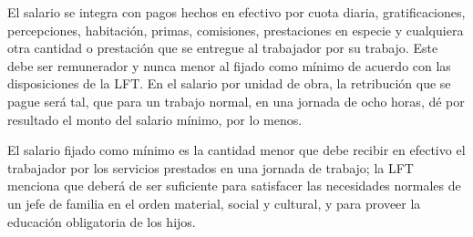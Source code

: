 El salario se integra con pagos hechos en efectivo por cuota diaria, gratificaciones, percepciones, habitación, primas, comisiones, prestaciones en especie y cualquiera otra cantidad o prestación que se entregue al trabajador por su trabajo. Este debe ser remunerador y nunca menor al fijado como mínimo de acuerdo con las disposiciones de la LFT. En el salario por unidad de obra, la retribución que se pague será tal, que para un trabajo normal, en una jornada de ocho horas, dé por resultado el monto del salario mínimo, por lo menos.

El salario fijado como mínimo es la cantidad menor que debe recibir en efectivo el trabajador por los servicios prestados en una jornada de trabajo; la LFT menciona que deberá de ser suficiente para satisfacer las necesidades normales de un jefe de familia en el orden material, social y cultural, y para proveer la educación obligatoria de los hijos.















































